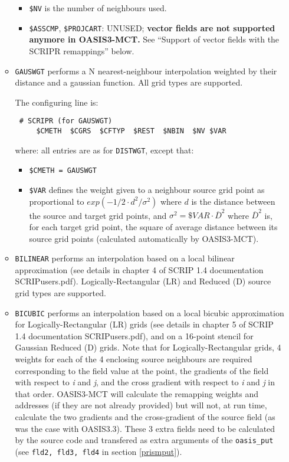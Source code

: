 \begin{itemize}
\begin{itemize}
\begin{itemize}
    \item {\tt \$NV} is the number of neighbours used.
    
    \item {\tt \$ASSCMP}, {\tt \$PROJCART}: UNUSED; {\bf vector fields are not supported
        anymore in OASIS3-MCT.} See ``Support of vector fields with
      the SCRIPR remappings'' below.
    \end{itemize}

  \item {\tt GAUSWGT} performs a N nearest-neighbour interpolation
    weighted by their distance and a gaussian function. All grid types
    are supported.

    The configuring line is:
  \begin{verbatim}
 # SCRIPR (for GAUSWGT)
     $CMETH  $CGRS  $CFTYP  $REST  $NBIN  $NV $VAR
\end{verbatim}
    where:
    all entries are as for {\tt DISTWGT}, except that:
    \begin{itemize}
    \item {\tt \$CMETH = GAUSWGT}
    \item {\tt \$VAR} defines the weight given to a neighbour source grid
      point as proportional to $exp(-1/2 \cdot d^2/\sigma^2)$ where
      $d$ is the distance between the source and target grid points,
      and $\sigma^2 = \$VAR \cdot \overline{D}^2$ where
      $\overline{D}^2$ is, for each target grid point, the square of average distance between its source grid points  
      (calculated automatically by OASIS3-MCT).
    \end{itemize}

  \item {\tt BILINEAR} performs an interpolation based on a local
    bilinear approximation (see details in chapter 4 of SCRIP 1.4
    documentation SCRIPusers.pdf). Logically-Rectangular (LR) and
    Reduced (D) source grid types are supported.

  \item {\tt BICUBIC} performs an interpolation based on a local
    bicubic approximation for Logically-Rectangular (LR) grids (see
    details in chapter 5 of SCRIP 1.4 documentation SCRIPusers.pdf),
    and on a 16-point stencil for Gaussian Reduced (D) grids.  Note
    that for Logically-Rectangular grids, 4 weights for each of the 4
    enclosing source neighbours are required corresponding to the
    field value at the point, the gradients of the field with respect
    to {\it i} and {\it j}, and
    the cross gradient with respect to {\it i} and {\it j} in that
    order. OASIS3-MCT will calculate the remapping weights and
    addresses (if they are not already provided) but will not, at run
    time, calculate the two gradients and the cross-gradient of the
    source field (as was the case with OASIS3.3). These 3 extra fields
    need to be calculated by the source code and transfered as extra
    arguments of the {\tt oasis\_put} (see {\tt fld2, fld3, fld4} in
    section \ref{prismput}).


\end{itemize}
\end{itemize}
